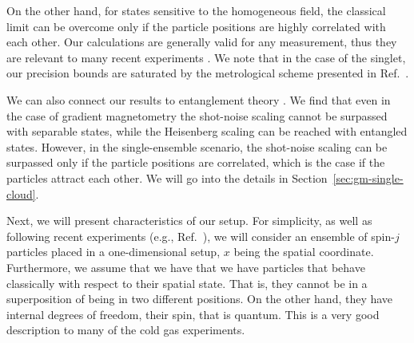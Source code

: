 On the other hand, for states sensitive to the homogeneous field, the classical limit can be overcome only if the particle positions are highly correlated with each other.
Our calculations are generally valid for any measurement, thus they are relevant to many recent experiments \cite{Wasilewski2010,Eckert2006,Wildermuth2006, Wolfgramm2010,Koschorreck2011,Vengalattore2007,Zhou2010,Behbood2013}.
We note that in the case of the singlet, our precision bounds are saturated by the metrological scheme presented in Ref.~\cite{Urizar-Lanz2013}.

We can also connect our results to entanglement theory \cite{Werner1989,Horodecki2009,Guehne2009}.
We find that even in the case of gradient magnetometry the shot-noise scaling cannot be surpassed with separable states, while the Heisenberg scaling can be reached with entangled states.
However, in the single-ensemble scenario, the shot-noise scaling can be surpassed only if the particle positions are correlated, which is the case if the particles attract each other.
We will go into the details in Section~\ref{sec:gm-single-cloud}.

Next, we will present characteristics of our setup.
For simplicity, as well as following  recent experiments (e.g., Ref.~\cite{Koschorreck2011}), we will consider an ensemble of spin-$j$ particles placed in a one-dimensional setup, $x$ being the spatial coordinate.
Furthermore, we assume that we have that we have particles that behave classically with respect to their spatial state.
That is, they cannot be in a superposition of being in two different positions.
On the other hand, they have internal degrees of freedom, their spin, that is quantum. This is a very good description to many of the cold gas experiments.

